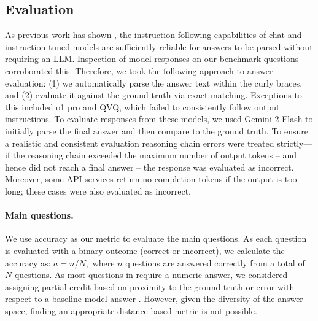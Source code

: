 \subsection{Evaluation}

As previous work has shown \cite{roberts2024grab}, the instruction-following capabilities of chat and instruction-tuned models are sufficiently reliable for answers to be parsed without requiring an LLM. Inspection of model responses on our benchmark questions corroborated this. Therefore, we took the following approach to answer evaluation: (1) we automatically parse the answer text within the curly braces, and (2) evaluate it against the ground truth via exact matching. Exceptions to this included o1 pro and QVQ, which failed to consistently follow output instructions. To evaluate responses from these models, we used Gemini 2 Flash to initially parse the final answer and then compare to the ground truth. To ensure a realistic and consistent evaluation reasoning chain errors were treated strictly---if the reasoning chain exceeded the maximum number of output tokens -- and hence did not reach a final answer -- the response was evaluated as incorrect. Moreover, some API services return no completion tokens if the output is too long; these cases were also evaluated as incorrect. 







\paragraph{Main questions.} We use accuracy as our metric to evaluate the \nquestions \benchmarkName main questions. As each question is evaluated with a binary outcome (correct or incorrect), we calculate the accuracy as: $a = n / N,$ where $n$ questions are answered correctly from a total of $N$ questions. As most questions in \benchmarkName require a numeric answer, we considered assigning partial credit based on proximity to the ground truth or error with respect to a baseline model answer \cite{kazemi2024remi}. However, given the diversity of the answer space, finding an appropriate distance-based metric is not possible.

